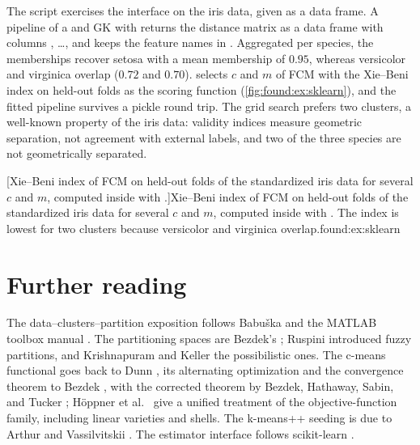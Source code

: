 The script  exercises the interface on the iris data, given as a  data frame. A pipeline of a  and GK with  returns the distance matrix as a data frame with columns , \dots, and keeps the feature names in . Aggregated per species, the memberships recover setosa with a mean membership of $0.95$, whereas versicolor and virginica overlap ($0.72$ and $0.70$).  selects $c$ and $m$ of FCM with the Xie--Beni index on held-out folds as the scoring function (\cref{fig:found:ex:sklearn}), and the fitted pipeline survives a pickle round trip. The grid search prefers two clusters, a well-known property of the iris data: validity indices measure geometric separation, not agreement with external labels, and two of the three species are not geometrically separated.

[Xie--Beni index of FCM on held-out folds of the standardized iris data for several $c$ and $m$, computed inside  with .]{Xie--Beni index of FCM on held-out folds of the standardized iris data for several $c$ and $m$, computed inside  with . The index is lowest for two clusters because versicolor and virginica overlap.}{found:ex:sklearn}

\section{Further reading}\label{sec:found:reading}

The data--clusters--partition exposition follows Babu\v{s}ka \cite{babuska:1998:book} and the MATLAB toolbox manual \cite{balasko:2005:toolbox}. The partitioning spaces are Bezdek's \cite{bezdek:1981}; Ruspini \cite{ruspini:1969} introduced fuzzy partitions, and Krishnapuram and Keller \cite{krishnapuram:1993:pcm} the possibilistic ones. The c-means functional goes back to Dunn \cite{dunn:1973:fcm}, its alternating optimization and the convergence theorem to Bezdek \cite{bezdek:1980:convergence,bezdek:1984:fcm}, with the corrected theorem by Bezdek, Hathaway, Sabin, and Tucker \cite{bezdek:1987:convergence}; H\"oppner et al.\ \cite{hoppner:1999:book} give a unified treatment of the objective-function family, including linear varieties and shells. The k-means++ seeding is due to Arthur and Vassilvitskii \cite{arthur:2007:kmeanspp}. The estimator interface follows scikit-learn \cite{pedregosa:2011:sklearn}.
